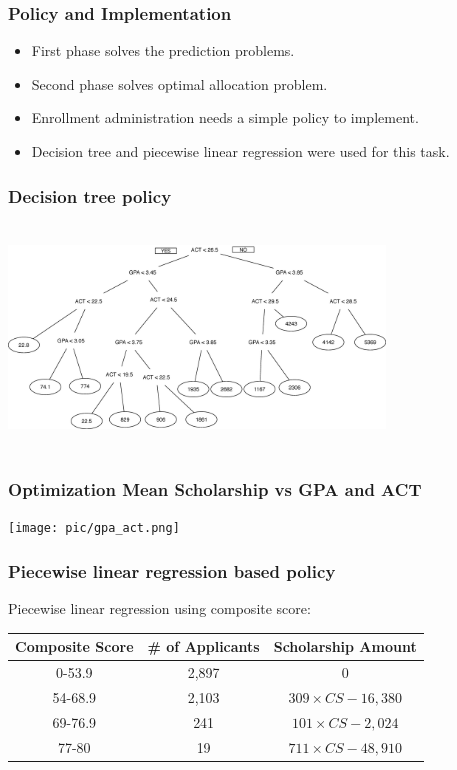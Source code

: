 \documentclass[aspectratio=169]{beamer}
\begin{document}
\begin{frame}
\frametitle{Policy and Implementation}
\begin{itemize}
\item First phase solves the prediction problems.
\item Second phase solves optimal allocation problem.
\item Enrollment administration needs a 
simple policy to implement.
\item  Decision tree and piecewise linear regression were used for this task.
\end{itemize}
 
\end{frame}

\begin{frame}
\frametitle{Decision tree policy}
\begin{center}
\includegraphics[width=10cm, height=6cm, scale = 0.4]
{pic/FA_DT_Result.eps}  
\end{center}
\end{frame}




\begin{frame}
\begin{centering}
\frametitle{Optimization Mean Scholarship vs GPA and ACT}
  \texttt{[image: pic/gpa\_act.png]}
  \end{centering}
\end{frame}


\begin{frame}
\frametitle{Piecewise linear regression based policy}

Piecewise linear regression using composite score:
\begin{table}[H]
\centering
\begin{tabular}{|c|c|c|}
\hline
Composite Score & \# of Applicants & Scholarship Amount \\ \hline
0-53.9         & 2,897  &0              \\ \hline
54-68.9        & 2,103  &$309\times CS -16,380 $            \\ \hline
69-76.9        &  241 &  $101\times CS - 2,024$           \\ \hline
77-80       & 19 &   $711 \times CS -48,910$          \\ \hline
\end{tabular}

\end{table}
\end{frame}
\end{document}
